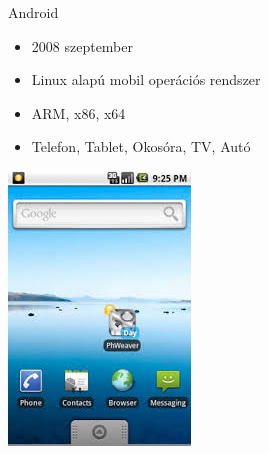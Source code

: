 \documentclass{beamer}
\begin{document}
\begin{frame}[fragile]{Android}
	\begin{minipage}{0.49\textwidth}
		\begin{itemize}
			\item 2008 szeptember
			\item Linux alapú mobil operációs rendszer
			\item ARM, x86, x64
			\item Telefon, Tablet, Okosóra, TV, Autó
		\end{itemize}
	\end{minipage}
	\begin{minipage}{.49\textwidth}
		\includegraphics[width=.8\linewidth]{figures/android10.jpeg}
	\end{minipage}
\end{frame}
\end{document}
